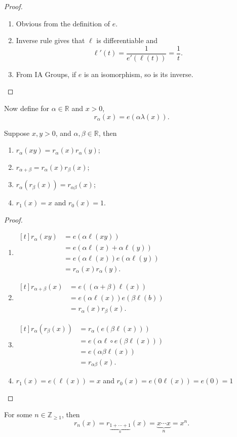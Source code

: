 \begin{proof}
    \leavevmode
    \begin{enumerate}
        \item Obvious from the definition of \(e\).
        \item Inverse rule gives that \(\ell\) is differentiable and
        \[
            \ell'(t) = \frac{1}{e'(\ell(t))} = \frac{1}{t}.
        \]
        \item From IA Groups, if \(e\) is an isomorphism, so is its inverse.
    \end{enumerate}
\end{proof}
Now define for \(\alpha \in \mathbb{R}\) and \(x > 0\),
\[
    r_\alpha(x) = e(\alpha \lambda(x)).
\]
\begin{theorem}{}{}
    Suppose \(x, y > 0\), and \(\alpha, \beta\in \mathbb{R}\), then
    \begin{enumerate}
        \item \(r_\alpha(xy) = r_\alpha(x)r_\alpha(y)\);
        \item \(r_{\alpha+\beta} = r_\alpha(x)r_\beta(x)\);
        \item \(r_\alpha(r_\beta(x)) = r_{\alpha \beta}(x)\);
        \item \(r_1(x) = x\) and \(r_0(x) = 1\).
    \end{enumerate}
\end{theorem}
\begin{proof}
    \leavevmode
    \begin{enumerate}
        \item \(\begin{aligned}[t]r_\alpha(xy) &= e(\alpha \ell(xy))\\
        &=e(\alpha\ell(x) + \alpha\ell(y))\\
        &=e(\alpha\ell(x))e(\alpha\ell(y))\\
        &=r_\alpha(x)r_\alpha(y).\end{aligned}\)
        \item \(\begin{aligned}[t]
            r_{\alpha+\beta}(x) &= e((\alpha + \beta)\ell(x))\\
            &= e(\alpha\ell(x))e(\beta\ell(b))\\
            &=r_\alpha(x)r_\beta(x).
        \end{aligned}\) 
        \item \(\begin{aligned}[t]
            r_\alpha(r_\beta(x)) &= r_\alpha(e(\beta \ell(x)))\\
            &= e(\alpha \ell \circ e(\beta\ell(x)))\\
            &= e(\alpha \beta \ell(x))\\
            &=r_{\alpha \beta}(x). 
        \end{aligned}\) 
        \item \(r_1(x) = e(\ell(x)) = x\) and \(r_0(x) = e(0 \ell(x)) = e(0) = 1\) 
    \end{enumerate}
\end{proof}
For some \(n \in \mathbb{Z}_{\geq 1}\), then
\[
    r_n(x) = r_{\underbrace{1 + \cdots + 1}_{n}}(x) = \underbrace{x \cdots x}_{n} = x^n.
\]

